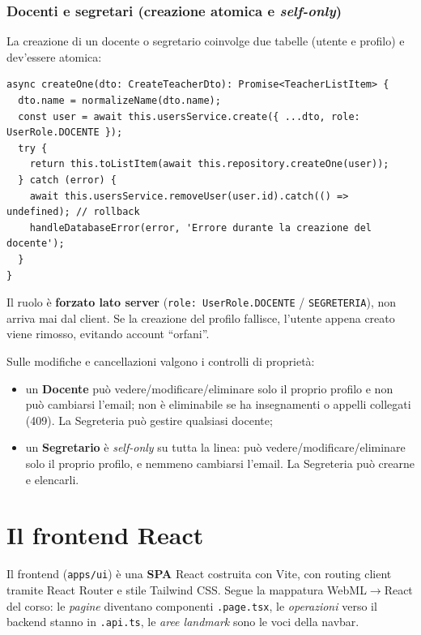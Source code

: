 \documentclass[11pt,a4paper,oneside]{report}
\newcommand{\code}[1]{\texttt{\small #1}}
\newcommand{\file}[1]{\texttt{\small #1}}
\begin{document}
\subsection{Docenti e segretari (creazione atomica e \emph{self-only})}
La creazione di un docente o segretario coinvolge due tabelle (utente e profilo)
e dev'essere atomica:

\begin{lstlisting}[caption={Creazione atomica di un docente con rollback.}]
async createOne(dto: CreateTeacherDto): Promise<TeacherListItem> {
  dto.name = normalizeName(dto.name);
  const user = await this.usersService.create({ ...dto, role: UserRole.DOCENTE });
  try {
    return this.toListItem(await this.repository.createOne(user));
  } catch (error) {
    await this.usersService.removeUser(user.id).catch(() => undefined); // rollback
    handleDatabaseError(error, 'Errore durante la creazione del docente');
  }
}
\end{lstlisting}

Il ruolo è \textbf{forzato lato server} (\code{role: UserRole.DOCENTE} /
\code{SEGRETERIA}), non arriva mai dal client. Se la creazione del profilo
fallisce, l'utente appena creato viene rimosso, evitando account ``orfani''.

Sulle modifiche e cancellazioni valgono i controlli di proprietà:
\begin{itemize}[leftmargin=1.4em]
  \item un \textbf{Docente} può vedere/modificare/eliminare solo il proprio
        profilo e non può cambiarsi l'email; non è eliminabile se ha insegnamenti
        o appelli collegati (409). La Segreteria può gestire qualsiasi docente;
  \item un \textbf{Segretario} è \emph{self-only} su tutta la linea: può
        vedere/modificare/eliminare solo il proprio profilo, e nemmeno cambiarsi
        l'email. La Segreteria può crearne e elencarli.
\end{itemize}

\chapter{Il frontend React}
\label{cap:frontend}

Il frontend (\code{apps/ui}) è una \textbf{SPA} React costruita con Vite, con
routing client tramite React Router e stile Tailwind CSS. Segue la mappatura
WebML$\rightarrow$React del corso: le \emph{pagine} diventano componenti
\file{*.page.tsx}, le \emph{operazioni} verso il backend stanno in
\file{*.api.ts}, le \emph{aree landmark} sono le voci della navbar.
\end{document}
